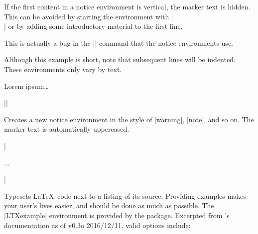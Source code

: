 \documentclass{ltxguidex}
\begin{document}
\begin{bug}
	If the first content in a notice environment is vertical, the marker
	text is hidden. This can be avoided by starting the
	environment with |\leavevmode\\| or by adding some introductory
	material to the first line.

	This is actually a bug in the |\list| command that the notice
	environments use.
\end{bug}

\begin{example}
	Although this example is short, note that subsequent lines will
	be indented. These environments only vary by text.

\begin{LTXexample}
\begin{warning}
    Lorem ipsum\dots
\end{warning}
\end{LTXexample}
\end{example}

\begin{desc}
||
\end{desc}

Creates a new notice environment in the style of |warning|, |note|, and so
on. The marker text is automatically uppercased.

\begin{desc}
|\begin{LTXexample}[<options>]...\end{LTXexample}|
\end{desc}

Typesets \LaTeX\ code next to a listing of its source. Providing examples
makes your user's lives easier, and should be done as much as possible. The
|LTXexample| environment is provided by the  package.
Excerpted from 's documentation as of v0.3o 2016/12/11, valid
options include:
\end{document}
